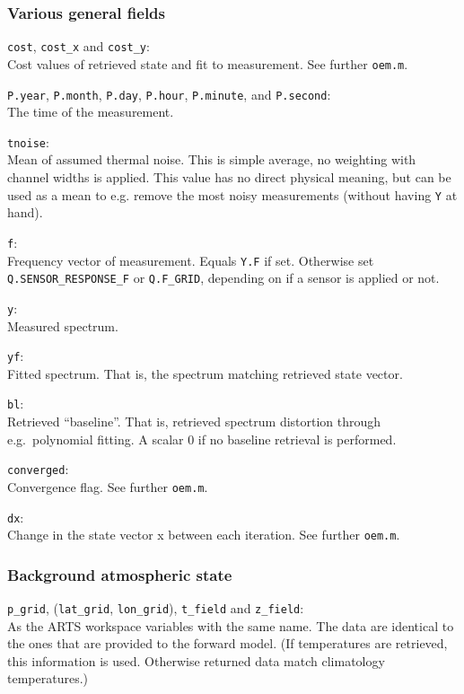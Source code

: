 \documentclass[a4paper,11pt]{article}
\newcommand{\newfield}{\vspace{1ex}\noindent}
\begin{document}
\subsubsection{Various general fields}
%
\newfield 
\verb|cost|, \verb|cost_x| and \verb|cost_y|:\\
Cost values of retrieved state and fit to measurement. See further \verb|oem.m|.

\newfield 
\verb|P.year|, \verb|P.month|, \verb|P.day|, \verb|P.hour|, \verb|P.minute|,
and \verb|P.second|:\\
The time of the measurement.

\newfield 
\verb|tnoise|:\\
Mean of assumed thermal noise. This is simple average, no weighting
with channel widths is applied. This value has no direct physical
meaning, but can be used as a mean to e.g. remove the most noisy
measurements (without having \verb|Y| at hand).

\newfield 
\verb|f|:\\
Frequency vector of measurement. Equals \verb|Y.F| if set. Otherwise
set \verb|Q.SENSOR_RESPONSE_F| or \verb|Q.F_GRID|, depending on if a sensor is
applied or not.

\newfield 
\verb|y|:\\
Measured spectrum.

\newfield 
\verb|yf|:\\
Fitted spectrum. That is, the spectrum matching retrieved state vector.

\newfield
\verb|bl|:\\
Retrieved ``baseline''. That is, retrieved spectrum distortion through
e.g.\ polynomial fitting. A scalar 0 if no baseline retrieval is performed.

\newfield 
\verb|converged|:\\
Convergence flag. See further \verb|oem.m|.

\newfield 
\verb|dx|:\\
Change in the state vector x between each iteration. See further \verb|oem.m|.



\subsubsection{Background atmospheric state}
%
\newfield \verb|p_grid|, (\verb|lat_grid|, \verb|lon_grid|), \verb|t_field| and
\verb|z_field|:\\
As the ARTS workspace variables with the same name. The data are identical to
the ones that are provided to the forward model. (If temperatures are retrieved,
this information is used. Otherwise returned data match climatology
temperatures.)
\end{document}
